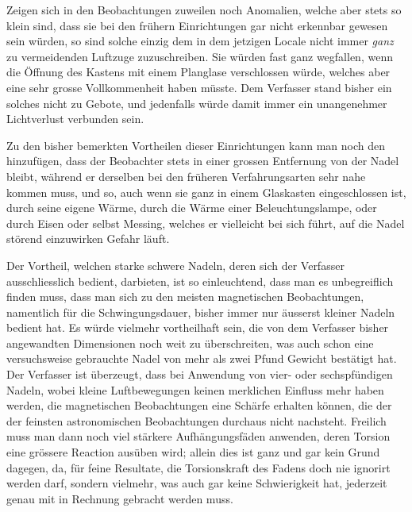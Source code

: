 Zeigen sich in den Beobachtungen zuweilen noch Anomalien, welche
aber stets so klein sind, dass sie bei den frühern Einrichtungen
gar nicht erkennbar gewesen sein würden, so sind solche einzig
dem in dem jetzigen Locale nicht immer \textit{ganz} zu vermeidenden
Luftzuge zuzuschreiben. Sie würden fast ganz wegfallen, wenn die
Öffnung des Kastens mit einem Planglase verschlossen würde,
\clearpage
{}
\noindent
welches aber eine sehr grosse Vollkommenheit haben müsste. Dem
Verfasser stand bisher ein solches nicht zu Gebote, und jedenfalls
würde damit immer ein unangenehmer Lichtverlust verbunden sein.

Zu den bisher bemerkten Vortheilen dieser Einrichtungen kann man
noch den hinzufügen, dass der Beobachter stets in einer grossen
Entfernung von der Nadel bleibt, während er derselben bei den
früheren Verfahrungsarten sehr nahe kommen muss, und so, auch wenn
sie ganz in einem Glaskasten eingeschlossen ist, durch seine eigene
Wärme, durch die Wärme einer Beleuchtungslampe, oder durch Eisen
oder selbst Messing, welches er vielleicht bei sich führt, auf
die Nadel störend einzuwirken Gefahr läuft.

Der Vortheil, welchen starke schwere Nadeln, deren sich der
Verfasser ausschliesslich bedient, darbieten, ist so einleuchtend,
dass man es unbegreiflich finden muss, dass man sich zu den meisten
magnetischen Beobachtungen, namentlich für die Schwingungsdauer,
bisher immer nur äusserst kleiner Nadeln bedient hat. Es würde
vielmehr vortheilhaft sein, die von dem Verfasser bisher angewandten
Dimensionen noch weit zu überschreiten, was auch schon eine
versuchsweise gebrauchte Nadel von mehr als zwei Pfund Gewicht
bestätigt hat. Der Verfasser ist überzeugt, dass bei Anwendung
von vier- oder sechspfündigen Nadeln, wobei kleine Luftbewegungen
keinen merklichen Einfluss mehr haben werden, die magnetischen
Beobachtungen eine Schärfe erhalten können, die der der feinsten
astronomischen Beobachtungen durchaus nicht nachsteht. Freilich
muss man dann noch viel stärkere Aufhängungsfäden anwenden, deren
Torsion eine grössere Reaction ausüben wird; allein dies ist ganz
und gar kein Grund dagegen, da, für feine Resultate, die Torsionskraft
des Fadens doch nie ignorirt werden darf, sondern vielmehr, was
auch gar keine Schwierigkeit hat, jederzeit genau mit in Rechnung
gebracht werden muss.

